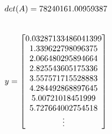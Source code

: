 \documentclass[11pt]{extarticle}
\begin{document}
	\begin{align}
		\setlength{\jot}{10pt}
		det(A) = 78240161.00959387 \\[20pt]
		y = \begin{bmatrix}
			0.03287133486041399 \\
			1.339622798096375 \\
			2.066480295894664 \\
			2.825543605175336 \\
			3.557571715528883 \\
			4.284492868897645 \\
			5.00721018451999 \\
			5.727664002754518 \\
			\vdots \\

\end{bmatrix}
\end{align}
\end{document}
